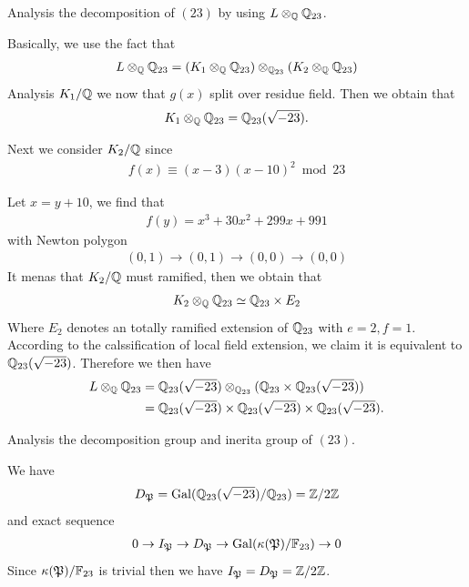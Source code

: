 {\prob Analysis the decomposition of $(23)$ by using $L\otimes_{\mathbb{Q}}\mathbb{Q}_{23}$.

Basically, we use the fact that 
\begin{align*}
    L\otimes_{\mathbb{Q}}\mathbb{Q}_{23}  = (K_1\otimes_{\mathbb{Q}} \mathbb{Q}_{23})\otimes_{\mathbb{Q}_{23}}(K_2\otimes_{\mathbb{Q}} \mathbb{Q}_{23})
\end{align*}
Analysis $K_1/\mathbb{Q}$ we now that $g(x)$ split over residue field. Then we obtain that 
\begin{align*}
    K_1\otimes_{\mathbb{Q}} \mathbb{Q}_{23}  = \mathbb{Q}_{23}(\sqrt{-23}).
\end{align*}

Next we consider $K_2/\mathbb{Q}$ since 
\begin{align*}
    f(x)\equiv (x-3)(x-10)^2 \bmod 23
\end{align*}

Let $x=y+10$, we find that 
\begin{align*}
    f(y)  = x^3+30x^2+299x+991
\end{align*}
with Newton polygon
\begin{align*}
    (0,1) \to (0,1) \to (0,0) \to (0,0)
\end{align*}
It menas that $K_2/\mathbb{Q}$ must ramified, then we obtain that 
\begin{align*}
    K_2\otimes_{\mathbb{Q}} \mathbb{Q}_{23} \simeq \mathbb{Q}_{23} \times E_2 
\end{align*}
Where $E_2$ denotes an totally ramified extension of $\mathbb{Q}_{23}$ with $e=2,f=1$.
According to the calssification of local field extension, we claim it is equivalent to $\mathbb{Q}_{23}(\sqrt{-23})$.
Therefore we then have 
\begin{align*}
    L\otimes_{\mathbb{Q}}\mathbb{Q}_{23} &= \mathbb{Q}_{23}(\sqrt{-23})\otimes_{\mathbb{Q}_{23}} (\mathbb{Q}_{23}\times \mathbb{Q}_{23}(\sqrt{-23}))\\
    &=\mathbb{Q}_{23}(\sqrt{-23}) \times \mathbb{Q}_{23}(\sqrt{-23}) \times \mathbb{Q}_{23}(\sqrt{-23}).
\end{align*} 

\prob Analysis the decomposition group and inerita group of $(23)$.

We have 
\begin{align*}
    D_{\mathfrak{P}} = \operatorname{Gal}(\mathbb{Q}_{23}(\sqrt{-23})/\mathbb{Q}_{23}) = \mathbb{Z}/2\mathbb{Z}
\end{align*}
and exact sequence 
\begin{align*}
    0\to I_{\mathfrak{P}} \to D_{\mathfrak{P}} \to \operatorname{Gal}(\kappa(\mathfrak{P})/\mathbb{F}_{23}) \to 0
\end{align*}
Since $\kappa(\mathfrak{P})/\mathbb{F}_{23}$ is trivial then we have $I_{\mathfrak{P}}=D_{\mathfrak{P}}=\mathbb{Z}/2\mathbb{Z}$.



}
